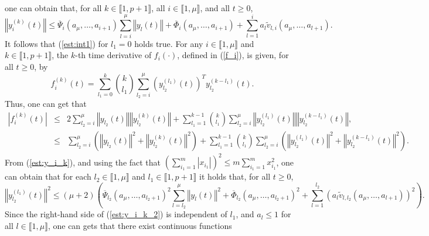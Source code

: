 \documentclass[letterpaper, 10pt]{article}
\newcommand{\rref}[1]{(\ref{#1})}
\newcommand{\norme}[1]{\left\Vert #1\right\Vert}
\newcommand{\abs}[1]{\left| #1 \right|}
\begin{document}
one can obtain that,  for all $k \in \llbracket 1 , p+1 \rrbracket $, all $i \in \llbracket 1 , \mu  \rrbracket $, and all $t\geq 0$,
\begin{equation}
\label{est:y_i_k}
\norme{y_i^{(k)}(t)} \leq  \overline{\Psi}_i(a_\mu , \ldots , a_{i+1})  \sum\limits_{l  =i}^{\mu }  \norme{y_l(t)} + \overline{\Phi}_i(a_\mu , \ldots , a_{i+1}) +  \sum\limits_{l  =1}^{i} a_l  \tilde{v}_{l ,i} (a_\mu , \ldots , a_{l+1}).
\end{equation}
It follows that \rref{est:int1} for $l_1=0$ holds true. For any $i \in \llbracket 1 , \mu  \rrbracket $ and $k \in \llbracket 1 , p+1 \rrbracket $, the $k$-th time derivative of $f_i(\cdot)$, defined in \rref{f_i}, is given, for all $t \geq 0$, by 
\begin{equation*}
f^{(k)}_i (t) = \sum\limits_{l_1 =0}^{k} \binom{k}{l_1} \sum\limits_{l_2 =i}^{\mu} ( y_{l_2}^{(l_1)} (t) )^T  y_{l_2}^{(k-l_1)} (t) .
\end{equation*} Thus, one can get that
\begin{eqnarray*}
\abs{f^{(k)}_i (t) } & \leq & 2 \sum\limits_{l_2 =i}^{\mu} \norme{ y_{l_2} (t) } \norme{  y_{l_2}^{(k)} (t) } + \sum\limits_{l_1 =1}^{k-1} \binom{k}{l_1} \sum\limits_{l_2 =i}^{\mu} \norme{ y_{l_2}^{(l_1)} (t) } \norme{  y_{l_2}^{(k-l_1)} (t) }, \\
& \leq & \sum\limits_{l_2 =i}^{\mu} \left( \norme{ y_{l_2} (t) }^2 + \norme{  y_{l_2}^{(k)} (t) }^2 \right) + \sum\limits_{l_1 =1}^{k-1}  \binom{k}{l_1} \sum\limits_{l_2 =i}^{\mu} \left(  \norme{ y_{l_2}^{(l_1)} (t) }^2 +  \norme{  y_{l_2}^{(k-l_1)} (t) }^2 \right).
\end{eqnarray*}
From \rref{est:y_i_k}, and using the fact that $\left( \sum\limits_{i_1=1}^{m} \abs{x_{i_1} } \right)^2 \leq m \sum\limits_{i_1=1}^m  x_{i_1}^2 $, one can obtain that for each $l_2 \in \llbracket 1 , \mu \rrbracket $ and $l_1 \in \llbracket 1 , p+1 \rrbracket $ it holds that, for all $t \geq 0 $,
\begin{equation}
\label{est:y_i_k_2}
\norme{ y_{l_2}^{(l_1)} (t) }^2 \leq (\mu +2) \left( \overline{\Psi}_{l_2} (a_\mu , \ldots , a_{l_2 +1})^2   \sum\limits_{l=l_2 }^{\mu} \norme{ y_{l} (t) }^2 +   \overline{\Phi}_{l_2}(a_\mu , \ldots , a_{l_2 +1})^2 +  \sum\limits_{l  =1}^{l_2} ( a_l  \tilde{v}_{l ,l_2} (a_\mu , \ldots , a_{l+1}) )^2\right).
\end{equation} 
Since the right-hand side of \rref{est:y_i_k_2} is independent of $l_1$, and $a_l \leq 1$ for all $l \in \llbracket 1, \mu \rrbracket $, one can gets that there exist continuous functions 
\end{document}
